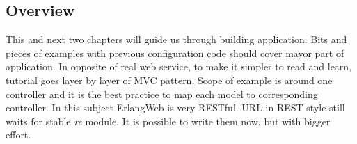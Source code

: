 \subsection{Overview}
This and next two chapters will guide us through building
application. Bits and pieces of examples with previous configuration code
should cover mayor part of application. In opposite of real web
service, to make it simpler to read and learn, tutorial goes layer by layer of
MVC pattern. Scope of example is around one controller and it is the best
practice to map each model to corresponding controller. In this subject
ErlangWeb is very RESTful. URL in REST style still waits for stable {\it re} module. 
It is possible to write them now, but with bigger effort.     

